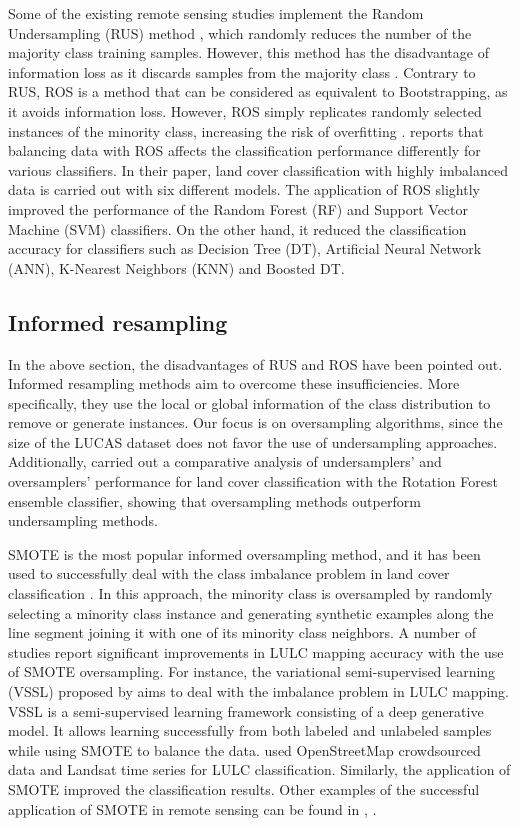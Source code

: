 \documentclass[remotesensing,article,submit,moreauthors,pdftex]{Definitions/mdpi}
\begin{document}
Some of the existing remote sensing studies implement the Random Undersampling
(RUS) method \cite{Azadbakht2016}, which randomly reduces the number of the
majority class training samples. However, this method has the disadvantage of
information loss as it discards samples from the majority class
\cite{Feng2019}. Contrary to RUS, ROS is a method that can be considered as
equivalent to Bootstrapping, as it avoids information loss. However, ROS simply
replicates randomly selected instances of the minority class, increasing the
risk of overfitting \cite{Krawczyk2016}. \cite{Maxwell2018} reports that
balancing data with ROS affects the classification performance differently for
various classifiers. In their paper, land cover classification with highly
imbalanced data is carried out with six different models. The application of
ROS slightly improved the performance of the Random Forest (RF) and Support
Vector Machine (SVM) classifiers. On the other hand, it reduced the
classification accuracy for classifiers such as Decision Tree (DT), Artificial
Neural Network (ANN), K-Nearest Neighbors (KNN) and Boosted DT.

\subsection{Informed resampling}

In the above section, the disadvantages of RUS and ROS have been pointed out.
Informed resampling methods aim to overcome these insufficiencies. More
specifically, they use the local or global information of the class distribution
to remove or generate instances. Our focus is on oversampling algorithms, since
the size of the LUCAS dataset does not favor the use of undersampling approaches.
Additionally, \cite{Feng2018} carried out a comparative analysis of
undersamplers' and oversamplers' performance for land cover classification with
the Rotation Forest ensemble classifier, showing that oversampling methods
outperform undersampling methods.

SMOTE is the most popular informed oversampling method, and it has been used to
successfully deal with the class imbalance problem in land cover classification
\cite{Cenggoro2018}. In this approach, the minority class is oversampled by
randomly selecting a minority class instance and generating synthetic examples
along the line segment joining it with one of its minority class neighbors. A
number of studies report significant improvements in LULC mapping accuracy with
the use of SMOTE oversampling. For instance, the variational semi-supervised
learning (VSSL) proposed by \cite{Cenggoro2018} aims to deal with the imbalance
problem in LULC mapping. VSSL is a semi-supervised learning framework consisting
of a deep generative model. It allows learning successfully from both labeled
and unlabeled samples while using SMOTE to balance the data. \cite{Johnson2016}
used OpenStreetMap crowdsourced data and Landsat time series for LULC
classification. Similarly, the application of SMOTE improved the classification
results. Other examples of the successful application of SMOTE in remote sensing
can be found in \cite{Bogner2018}, \cite{Panda2018}.
\end{document}
